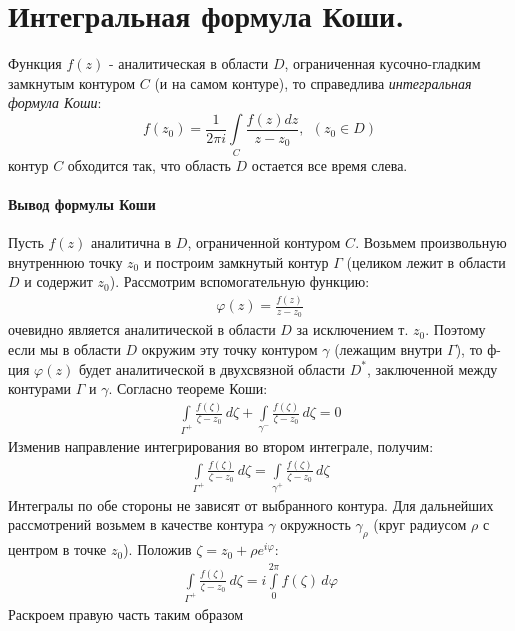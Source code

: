 \documentclass[12pt]{extarticle}
\renewcommand{\d}{\,d}
\begin{document}
\section{Интегральная формула Коши.}
Функция $f(z)$ - аналитическая в области $D$, ограниченная
кусочно-гладким замкнутым контуром $C$ (и на самом контуре), то
справедлива \textit{интегральная формула Коши}:
\begin{displaymath}
    f(z_{0})=\frac{1}{2\pi i}\int\limits_{C}\frac{f(z)dz}{z-z_{0}},
    \ \ (z_{0}\in D)
\end{displaymath}
контур $C$ обходится так, что область $D$ остается все время слева.

\paragraph{Вывод формулы Коши}
Пусть $f(z)$ аналитична в $D$, ограниченной контуром $C$. Возьмем
произвольную внутреннюю точку $z_{0}$ и построим замкнутый контур
$\Gamma$ (целиком лежит в области $D$ и содержит $z_{0}$). Рассмотрим
вспомогательную функцию:
\begin{eqnarray*}
    \varphi(z)=\frac{f(z)}{z-z_{0}}
\end{eqnarray*}
очевидно является аналитической в области $D$ за исключением т. $z_{0}$.
Поэтому если мы в области $D$ окружим эту точку контуром $\gamma$
(лежащим внутри $\Gamma$), то ф-ция $\varphi(z)$ будет аналитической в
двухсвязной области $D^{*}$, заключенной между контурами $\Gamma$ и
$\gamma$. Согласно теореме Коши:
\begin{eqnarray*}
    \int\limits_{\Gamma^{+}}\frac{f(\zeta)}{\zeta-z_{0}}\d{\zeta}
    +\int\limits_{\gamma^{-}}\frac{f(\zeta)}{\zeta-z_{0}}\d{\zeta}
    =0
\end{eqnarray*}
Изменив направление интегрирования во втором интеграле, получим:
\begin{eqnarray*}
    \int\limits_{\Gamma^{+}}\frac{f(\zeta)}{\zeta-z_{0}}\d{\zeta}
    =\int\limits_{\gamma^{+}}\frac{f(\zeta)}{\zeta-z_{0}}\d{\zeta}
\end{eqnarray*}
Интегралы по обе стороны не зависят от выбранного контура. Для
дальнейших рассмотрений возьмем в качестве контура $\gamma$ окружность
$\gamma_{\rho}$ (круг радиусом $\rho$ с центром в точке $z_{0}$).
Положив $\zeta=z_{0}+\rho e^{i\varphi}$:
\begin{eqnarray*}
    \int\limits_{\Gamma^{+}}\frac{f(\zeta)}{\zeta-z_{0}}\d{\zeta}
    =i\int\limits_{0}^{2\pi}f(\zeta)\d{\varphi}
\end{eqnarray*}
Раскроем правую часть таким образом
\end{document}
